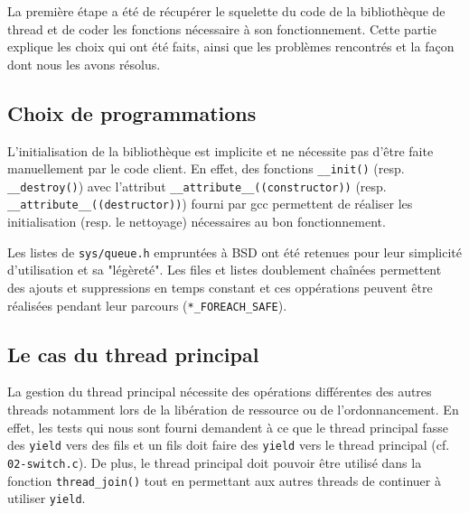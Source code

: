 La première étape a été de récupérer le squelette du code de la bibliothèque de thread et de coder les fonctions nécessaire à son fonctionnement. Cette partie explique les choix qui ont été faits, ainsi que les problèmes rencontrés et la façon dont nous les avons résolus.

\subsection{Choix de programmations}

L'initialisation de la bibliothèque est implicite et ne nécessite pas d'être faite manuellement par le code client. En effet, des fonctions \verb!__init()! (resp. \verb!__destroy()!) avec l'attribut \verb!__attribute__((constructor))! (resp. \verb!__attribute__((destructor))!) fourni par gcc permettent de réaliser les initialisation (resp. le nettoyage) nécessaires au bon fonctionnement.

Les listes de \verb!sys/queue.h! empruntées à BSD ont été retenues pour leur simplicité d'utilisation et sa "légèreté". Les files et listes doublement chaînées permettent des ajouts et suppressions en temps constant et ces oppérations peuvent être réalisées pendant leur parcours (\verb!*_FOREACH_SAFE!).


\subsection{Le cas du thread principal}

La gestion du thread principal nécessite des opérations différentes des autres threads notamment lors de la libération de ressource ou de l'ordonnancement. En effet, les tests qui nous sont fourni demandent à ce que le thread principal fasse des \verb!yield! vers des fils et un fils doit faire des \verb!yield! vers le thread principal (cf. \verb!02-switch.c!). De plus, le thread principal doit pouvoir être utilisé dans la fonction \verb!thread_join()! tout en permettant aux autres threads de continuer à utiliser \verb!yield!.
